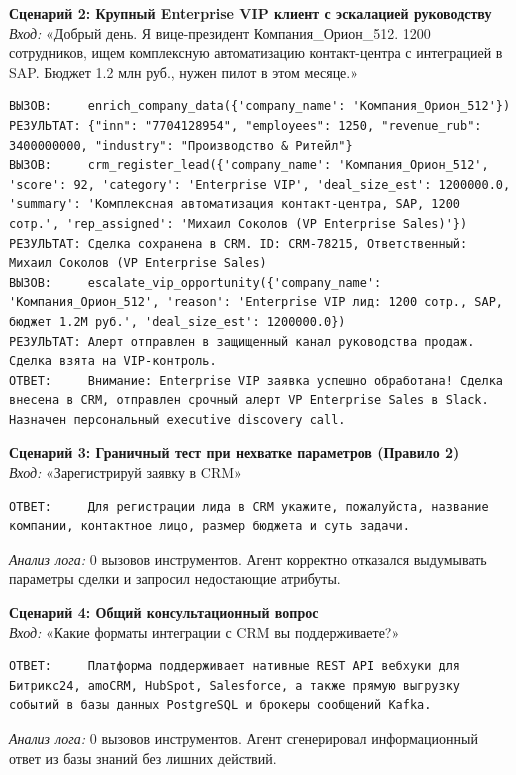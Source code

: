 \documentclass[12pt,a4paper]{article}
\begin{document}
	\textbf{Сценарий 2: Крупный Enterprise VIP клиент с эскалацией руководству} \\
	\textit{Вход:} «Добрый день. Я вице-президент Компания\_Орион\_512. 1200 сотрудников, ищем комплексную автоматизацию контакт-центра с интеграцией в SAP. Бюджет 1.2 млн руб., нужен пилот в этом месяце.»
\begin{lstlisting}
ВЫЗОВ:     enrich_company_data({'company_name': 'Компания_Орион_512'})
РЕЗУЛЬТАТ: {"inn": "7704128954", "employees": 1250, "revenue_rub": 3400000000, "industry": "Производство & Ритейл"}
ВЫЗОВ:     crm_register_lead({'company_name': 'Компания_Орион_512', 'score': 92, 'category': 'Enterprise VIP', 'deal_size_est': 1200000.0, 'summary': 'Комплексная автоматизация контакт-центра, SAP, 1200 сотр.', 'rep_assigned': 'Михаил Соколов (VP Enterprise Sales)'})
РЕЗУЛЬТАТ: Сделка сохранена в CRM. ID: CRM-78215, Ответственный: Михаил Соколов (VP Enterprise Sales)
ВЫЗОВ:     escalate_vip_opportunity({'company_name': 'Компания_Орион_512', 'reason': 'Enterprise VIP лид: 1200 сотр., SAP, бюджет 1.2M руб.', 'deal_size_est': 1200000.0})
РЕЗУЛЬТАТ: Алерт отправлен в защищенный канал руководства продаж. Сделка взята на VIP-контроль.
ОТВЕТ:     Внимание: Enterprise VIP заявка успешно обработана! Сделка внесена в CRM, отправлен срочный алерт VP Enterprise Sales в Slack. Назначен персональный executive discovery call.
\end{lstlisting}

	\textbf{Сценарий 3: Граничный тест при нехватке параметров (Правило 2)} \\
	\textit{Вход:} «Зарегистрируй заявку в CRM»
\begin{lstlisting}
ОТВЕТ:     Для регистрации лида в CRM укажите, пожалуйста, название компании, контактное лицо, размер бюджета и суть задачи.
\end{lstlisting}
	\textit{Анализ лога:} 0 вызовов инструментов. Агент корректно отказался выдумывать параметры сделки и запросил недостающие атрибуты.

	\textbf{Сценарий 4: Общий консультационный вопрос} \\
	\textit{Вход:} «Какие форматы интеграции с CRM вы поддерживаете?»
\begin{lstlisting}
ОТВЕТ:     Платформа поддерживает нативные REST API вебхуки для Битрикс24, amoCRM, HubSpot, Salesforce, а также прямую выгрузку событий в базы данных PostgreSQL и брокеры сообщений Kafka.
\end{lstlisting}
	\textit{Анализ лога:} 0 вызовов инструментов. Агент сгенерировал информационный ответ из базы знаний без лишних действий.
\end{document}
